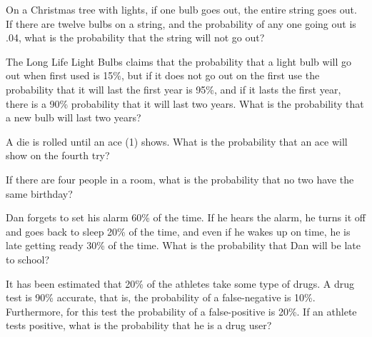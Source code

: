 \begin{puzzle}
    On a Christmas tree with lights, if one bulb goes out, the entire string goes out. If there are twelve bulbs on a string, and the probability of any one going out is .04, what is the probability that the string will not go out?
\end{puzzle}

\begin{puzzle}
    The Long Life Light Bulbs claims that the probability that a light bulb will go out when first used is 15\%, but if it does not go out on the first use the probability that it will last the first year is 95\%, and if it lasts the first year, there is a 90\% probability that it will last two years. What is the probability that a new bulb will last two years?
\end{puzzle}

\begin{puzzle}
    A die is rolled until an ace (1) shows. What is the probability that an ace will show on the fourth try?
\end{puzzle}

\begin{puzzle}
    If there are four people in a room, what is the probability that no two have the same birthday?
\end{puzzle}

\begin{puzzle}
    Dan forgets to set his alarm 60\% of the time. If he hears the alarm, he turns it off and goes back to sleep 20\% of the time, and even if he wakes up on time, he is late getting ready 30\% of the time. What is the probability that Dan will be late to school?
\end{puzzle}

\begin{puzzle}
    It has been estimated that 20\% of the athletes take some type of drugs. A drug test is 90\% accurate, that is, the probability of a false-negative is 10\%. Furthermore, for this test the probability of a false-positive is 20\%. If an athlete tests positive, what is the probability that he is a drug user?
\end{puzzle}
